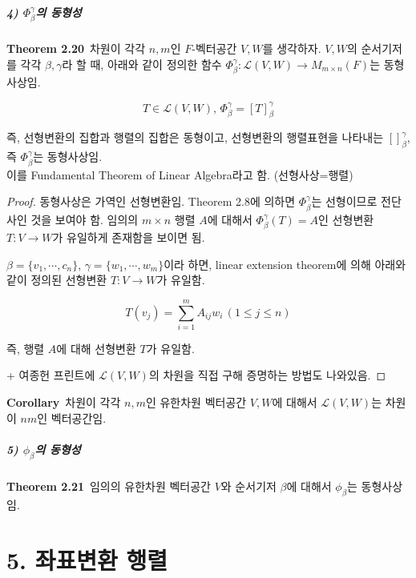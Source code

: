 \newpage


\subsubsection*{4) $\Phi^{\gamma}_{\beta}$의 동형성}
\textbf{Theorem 2.20}\, 차원이 각각 $n,m$인 $F$-벡터공간 $V,W$를 생각하자. $V,W$의 순서기저를 각각 $\beta,\gamma$라 할 때, 아래와 같이 정의한 함수 $\Phi^{\gamma}_{\beta}:\mathcal{L}(V,W) \rightarrow M_{m \times n}(F)$는 동형사상임.

\[
T \in \mathcal{L}(V,W),\,\Phi^{\gamma}_{\beta}=[T]^{\gamma}_{\beta}
\]

즉, 선형변환의 집합과 행렬의 집합은 동형이고, 선형변환의 행렬표현을 나타내는 $[]_{\beta}^{\gamma}$, 즉 $\Phi^{\gamma}_{\beta}$는 동형사상임.\\
이를 Fundamental Theorem of Linear Algebra라고 함. (선형사상=행렬)

\begin{proof}
동형사상은 가역인 선형변환임. Theorem 2.8에 의하면 $\Phi^{\gamma}_{\beta}$는 선형이므로 전단사인 것을 보여야 함. 임의의 $m \times n$ 행렬 $A$에 대해서 $\Phi^{\gamma}_{\beta}(T)=A$인 선형변환 $T:V \rightarrow W$가 유일하게 존재함을 보이면 됨.

$\beta=\{v_1, \cdots ,c_n\}$, $\gamma=\{w_1, \cdots ,w_m\}$이라 하면, linear extension theorem에 의해 아래와 같이 정의된 선형변환 $T:V \rightarrow W$가 유일함.

\[
T(v_j)=\sum_{i=1}^{m}A_{ij}w_i\,(1 \leq j \leq n)
\]

즉, 행렬 $A$에 대해 선형변환 $T$가 유일함.

+ 여종헌 프린트에 $\mathcal{L}(V,W)$의 차원을 직접 구해 증명하는 방법도 나와있음.
\end{proof}

\textbf{Corollary}\, 차원이 각각 $n,m$인 유한차원 벡터공간 $V,W$에 대해서 $\mathcal{L}(V,W)$는 차원이 $nm$인 벡터공간임.

\subsubsection*{5) $\phi_{\beta}$의 동형성}
\textbf{Theorem 2.21}\, 임의의 유한차원 벡터공간 $V$와 순서기저 $\beta$에 대해서 $\phi_{\beta}$는 동형사상임.


\newpage

\part*{5. 좌표변환 행렬}

